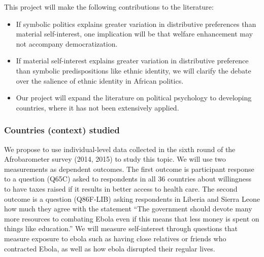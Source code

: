 \documentclass[]{article}
\begin{document}
This project will make the following contributions to the literature:

\begin{itemize}
\item If symbolic politics explains greater variation in distributive preferences than material self-interest, one implication will be that welfare enhancement may not accompany democratization.
\item If material self-interest explains greater variation in distributive preference than symbolic predispositions like ethnic identity, we will clarify the debate over the salience of ethnic identity in African politics.
\item Our project will expand the literature on political psychology to developing countries, where it has not been extensively applied.
\end{itemize}

\subsubsection{Countries (context)
studied}\label{countries-context-studied}

We propose to use individual-level data collected in the sixth round of
the Afrobarometer survey (2014, 2015) to study this topic. We will use
two measurements as dependent outcomes. The first outcome is participant
response to a question (Q65C) asked to respondents in all 36 countries
about willingness to have taxes raised if it results in better access to
health care. The second outcome is a question (Q86F-LIB) asking
respondents in Liberia and Sierra Leone how much they agree with the
statement ``The government should devote many more resources to
combating Ebola even if this means that less money is spent on things
like education.'' We will measure self-interest through questions that
measure exposure to ebola such as having close relatives or friends who
contracted Ebola, as well as how ebola disrupted their regular lives.
\end{document}
